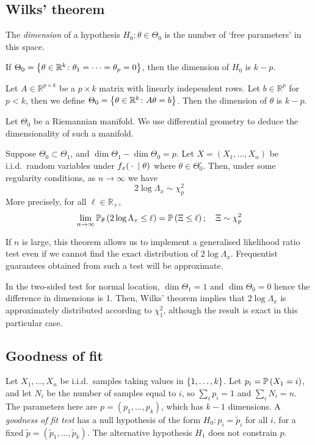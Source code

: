 \subsection{Wilks' theorem}
\begin{definition}
	The \textit{dimension} of a hypothesis \( H_0 \colon \theta \in \Theta_0 \) is the number of `free parameters' in this space.
\end{definition}
\begin{example}
	If \( \Theta_0 = \qty{\theta \in \mathbb R^k \colon \theta_1 = \dots = \theta_p = 0 } \), then the dimension of \( H_0 \) is \( k - p \).

	Let \( A \in \mathbb R^{p \times k} \) be a \( p \times k \) matrix with linearly independent rows.
	Let \( b \in \mathbb R^p \) for \( p < k \), then we define \( \Theta_0 = \qty{\theta \in \mathbb R^k \colon A\theta = b} \).
	Then the dimension of \( \theta \) is \( k - p \).

	Let \( \Theta_0 \) be a Riemannian manifold.
	We use differential geometry to deduce the dimensionality of such a manifold.
\end{example}
\begin{theorem}
	Suppose \( \Theta_0 \subset \Theta_1 \), and \( \dim \Theta_1 - \dim \Theta_0 = p \).
	Let \( X = (X_1, \dots, X_n) \) be i.i.d.\ random variables under \( f_x({}\cdot{}\mid\theta) \) where \( \theta \in \Theta_0^\circ \).
	Then, under some regularity conditions, as \( n \to \infty \) we have
	\[ 2\log\Lambda_x \sim \chi_p^2 \]
	More precisely, for all \( \ell \in \mathbb R_+ \),
	\[ \lim_{n \to \infty} \mathbb{P}_{\theta}\left({2\log \Lambda_x \leq \ell}\right) = \mathbb{P}\left({\Xi \leq \ell}\right);\quad \Xi \sim \chi_p^2 \]
\end{theorem}
\begin{remark}
	If \( n \) is large, this theorem allows us to implement a generalised likelihood ratio test even if we cannot find the exact distribution of \( 2 \log \Lambda_x \).
	Frequentist guarantees obtained from such a test will be approximate.
\end{remark}
\begin{example}
	In the two-sided test for normal location, \( \dim \Theta_1 = 1 \) and \( \dim \Theta_0 = 0 \) hence the difference in dimensions is 1.
	Then, Wilks' theorem implies that \( 2 \log \Lambda_x \) is approximately distributed according to \( \chi_1^2 \), although the result is exact in this particular case.
\end{example}

\subsection{Goodness of fit}
Let \( X_1, \dots, X_n \) be i.i.d.\ samples taking values in \( \qty{1, \dots, k} \).
Let \( p_i = \mathbb{P}\left({X_1 = i}\right) \), and let \( N_i \) be the number of samples equal to \( i \), so \( \sum_i p_i = 1\) and \( \sum_i N_i = n \).
The parameters here are \( p = (p_1, \dots, p_k) \), which has \( k - 1 \) dimensions.
A \textit{goodness of fit test} has a null hypothesis of the form \( H_0 \colon p_i = \widetilde p_i \) for all \( i \), for a fixed \( \widetilde p = (\widetilde p_1, \dots, \widetilde p_k) \).
The alternative hypothesis \( H_1 \) does not constrain \( p \).

